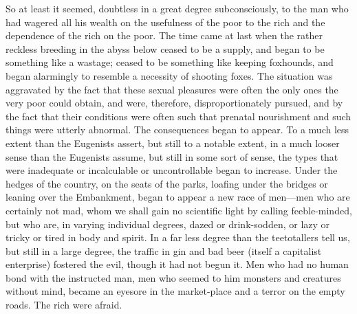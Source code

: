 \documentclass{book}
\begin{document}
So at least it seemed, doubtless in a great degree subconsciously, to the man who had wagered all his wealth on the usefulness of the poor to the rich and the dependence of the rich on the poor. The time came at last when the rather reckless breeding in the abyss below ceased to be a supply, and began to be something like a wastage; ceased to be something like keeping foxhounds, and began alarmingly to resemble a necessity of shooting foxes. The situation was aggravated by the fact that these sexual pleasures were often the only ones the very poor could obtain, and were, therefore, disproportionately pursued, and by the fact that their conditions were often such that prenatal nourishment and such things were utterly abnormal. The consequences began to appear. To a much less extent than the Eugenists assert, but still to a notable extent, in a much looser sense than the Eugenists assume, but still in some sort of sense, the types that were inadequate or incalculable or uncontrollable began to increase. Under the hedges of the country, on the seats of the parks, loafing under the bridges or leaning over the Embankment, began to appear a new race of men—men who are certainly not mad, whom we shall gain no scientific light by calling feeble-minded, but who are, in varying individual degrees, dazed or drink-sodden, or lazy or tricky or tired in body and spirit. In a far less degree than the teetotallers tell us, but still in a large degree, the traffic in gin and bad beer (itself a capitalist enterprise) fostered the evil, though it had not begun it. Men who had no human bond with the instructed man, men who seemed to him monsters and creatures without mind, became an eyesore in the market-place and a terror on the empty roads. The rich were afraid.
\end{document}
